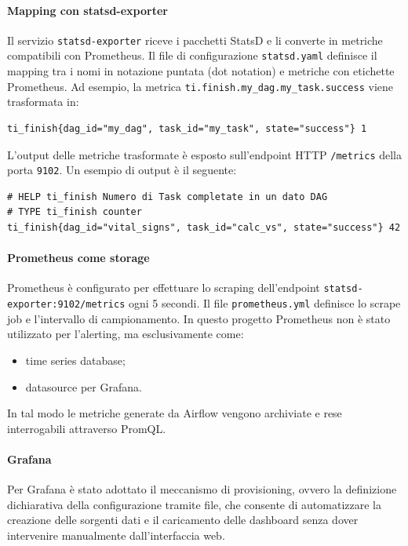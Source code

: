 \paragraph{Mapping con statsd-exporter}
Il servizio \texttt{statsd-exporter} riceve i pacchetti StatsD e li converte in metriche compatibili con Prometheus.  
Il file di configurazione \texttt{statsd.yaml} definisce il mapping tra i nomi in notazione puntata (dot notation) e metriche con etichette Prometheus.  
Ad esempio, la metrica \texttt{ti.finish.my\_dag.my\_task.success} viene trasformata in:
\begin{verbatim}
ti_finish{dag_id="my_dag", task_id="my_task", state="success"} 1
\end{verbatim}
L'output delle metriche trasformate è esposto sull'endpoint HTTP \texttt{/metrics} della porta \texttt{9102}.  
Un esempio di output è il seguente:
\begin{verbatim}
# HELP ti_finish Numero di Task completate in un dato DAG
# TYPE ti_finish counter
ti_finish{dag_id="vital_signs", task_id="calc_vs", state="success"} 42
\end{verbatim}

\paragraph{Prometheus come storage}
Prometheus è configurato per effettuare lo scraping dell’endpoint \texttt{statsd-exporter:9102/metrics} ogni 5 secondi.  
Il file \texttt{prometheus.yml} definisce lo scrape job e l’intervallo di campionamento.  
In questo progetto Prometheus non è stato utilizzato per l’alerting, ma esclusivamente come:
\begin{itemize}
    \item time series database;
    \item datasource per Grafana.
\end{itemize}
In tal modo le metriche generate da Airflow vengono archiviate e rese interrogabili attraverso PromQL.

\paragraph{Grafana}
Per Grafana è stato adottato il meccanismo di provisioning, ovvero la definizione dichiarativa della configurazione tramite file, che consente di automatizzare la creazione delle sorgenti dati e il caricamento delle dashboard senza dover intervenire manualmente dall’interfaccia web.


